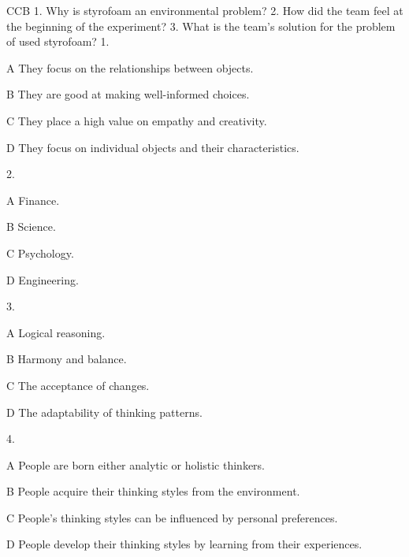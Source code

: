 \begin{enumerate}
	CCB
	1. Why is styrofoam an environmental problem?
	2. How did the team feel at the beginning of the experiment?
	3. What is the team's solution for the problem of used styrofoam?
	1.
	
	A
	They focus on the relationships between objects.
	
	B
	They are good at making well-informed choices.
	
	C
	They place a high value on empathy and creativity.
	
	D
	They focus on individual objects and their characteristics.
	
	2.
	
	A
	Finance.
	
	B
	Science.
	
	C
	Psychology.
	
	D
	Engineering.
	
	3.
	
	A
	Logical reasoning.
	
	B
	Harmony and balance.
	
	C
	The acceptance of changes.
	
	D
	The adaptability of thinking patterns.
	
	4.
	
	A
	People are born either analytic or holistic thinkers.
	
	B
	People acquire their thinking styles from the environment.
	
	C
	People's thinking styles can be influenced by personal preferences.
	
	D
	People develop their thinking styles by learning from their experiences.
\end{enumerate}
